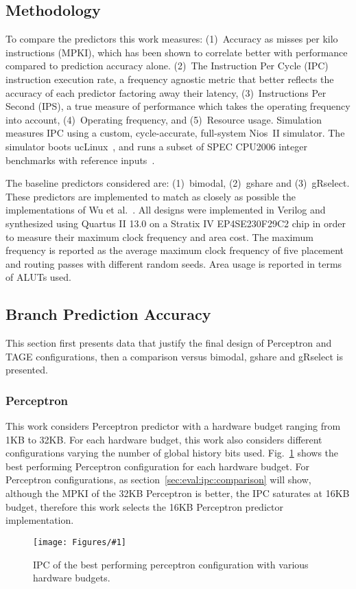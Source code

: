 \documentclass[conference]{IEEEtran}
\newcommand{\kfig}[4]{ %
        \begin{figure}[!t]
        \centering
        \texttt{[image: Figures/\#1]}
        \vspace{-1mm}
        \caption{#3}
        \label{#2}
        \end{figure}
}
\begin{document}
\subsection{Methodology}
\label{sec:eval:methodology}
To compare the predictors this work measures: (1)~Accuracy as misses per kilo instructions (MPKI), which has been shown to correlate better with performance compared to prediction accuracy alone. (2)~The Instruction Per Cycle (IPC) instruction execution rate, a frequency agnostic metric that better reflects the accuracy of each predictor factoring away their latency, (3)~Instructions Per Second (IPS), a true measure of performance which takes the operating frequency into account, (4)~Operating frequency, and (5)~Resource usage. Simulation measures IPC using a custom, cycle-accurate, full-system Nios~II simulator. The simulator boots ucLinux~\cite{uclinux}, and runs a subset of SPEC CPU2006 integer benchmarks with reference inputs~\cite{spec2k6}.

The baseline predictors considered are: (1)~bimodal, (2)~gshare and (3)~gRselect. These predictors are implemented to match as closely as possible the implementations of Wu et al.~\cite{grselect}. All designs were implemented in Verilog and synthesized using Quartus II 13.0 on a Stratix IV EP4SE230F29C2 chip in order to measure their maximum clock frequency and area cost. The maximum frequency is reported as the average maximum clock frequency of five placement and routing passes with different random seeds. Area usage is reported in terms of ALUTs used.

\subsection{Branch Prediction Accuracy}
\label{sec:eval:ipc}
This section first presents data that justify the final design of Perceptron and TAGE configurations, then a comparison versus bimodal, gshare and gRselect is presented.

\subsubsection{Perceptron}
\label{sec:eval:ipc:perceptron}
This work considers Perceptron predictor with a hardware budget ranging from 1KB to 32KB. For each hardware budget, this work also considers different configurations varying the number of global history bits used. Fig.~\ref{fig:perceptronIPC} shows the best performing Perceptron configuration for each hardware budget. For Perceptron configurations, as section~\ref{sec:eval:ipc:comparison} will show, although the MPKI of the 32KB Perceptron is better, the IPC saturates at 16KB budget, therefore this work selects the 16KB Perceptron predictor implementation.
\kfig{perceptronIPC.pdf}{fig:perceptronIPC}{IPC of the best performing perceptron configuration with various hardware budgets.}{angle = 0, trim = 0.9in 4.5in 0.8in 5in, clip, width=0.4\textwidth}
\end{document}
